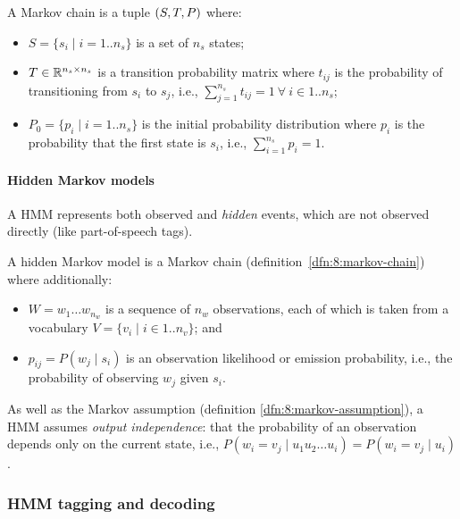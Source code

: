 \begin{dfn}
  \label{dfn:8:markov-chain}
  A Markov chain is a tuple $(S, T, P)$ where:
  \begin{itemize}
    \item $S = \{ s_i \mid i = 1 .. n_s \}$ is a set of $n_s$ states;
    \item $T \in \mathbb{R}^{n_s \times n_s}$ is a transition probability
          matrix where $t_{ij}$ is the probability of transitioning from $s_i$
          to $s_j$, i.e.,
          $\sum_{j = 1}^{n_s} t_{ij} = 1 \ \forall\ i \in 1 .. n_s$;
    \item $P_0 = \{ p_i \mid i = 1 .. n_s \}$ is the initial probability
          distribution where $p_i$ is the probability that the first state is
          $s_i$, i.e.,
          $\sum_{i = 1}^{n_s} p_i = 1$.
  \end{itemize}
\end{dfn}

\paragraph{Hidden Markov models}

A HMM represents both observed and \textit{hidden} events, which are not
observed directly (like part-of-speech tags).

\begin{dfn}
  \label{dfn:8:hidden-markov-model}
  A hidden Markov model is a Markov chain (definition~\ref{dfn:8:markov-chain})
  where additionally:
  \begin{itemize}
    \item $W = w_1 \dots w_{n_w}$ is a sequence of $n_w$ observations, each of
          which is taken from a vocabulary $V = \{ v_i \mid i \in 1 .. n_v \}$;
          and
    \item $p_{ij} = P(w_j \mid s_i)$ is an observation likelihood or emission
          probability, i.e., the probability of observing $w_j$ given $s_i$.
  \end{itemize}
\end{dfn}

As well as the Markov assumption (definition \ref{dfn:8:markov-assumption}), a
HMM assumes \textit{output independence}: that the probability of an observation
depends only on the current state, i.e.,
$P(w_i = v_j \mid u_1 u_2 \dots u_i) = P(w_i = v_j \mid u_i)$.

\subsubsection{HMM tagging and decoding}

